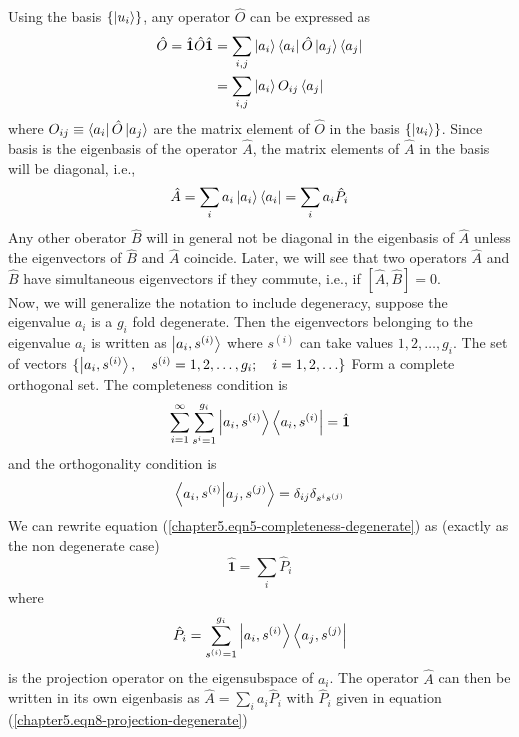 	Using the basis $\{\ket{u_i}\}$, any operator $\hat{O}$ can be expressed as 
	\begin{eqnarray}
		\hat{O} = \hat{\mathbf{1}} \hat{O} \hat{\mathbf{1}} 
		&= \sum_{i,j} \ket{a_i}\bra{a_i} \hat{O} \ket{a_j}\bra{a_j} \nonumber \\
		&= \sum_{i,j} \ket{a_i} O_{ij} \bra{a_j}
		\label{chapter5.eqn3-operator-as-matrix}
	\end{eqnarray}
	where $O_{ij} \equiv \bra{a_i} \hat{O} \ket{a_j}$ are the matrix element of  $\hat{O}$ in the basis $\{\ket{u_i}\}$. Since basis is the eigenbasis of the operator $\hat{A}$, the matrix elements of $\hat{A}$ in the basis will be diagonal, i.e., 
	\begin{equation}
		\hat{A} = \sum_i a_i \ket{a_i}\bra{a_i} = \sum_i a_i \hat{P}_i
		\label{chapter5.eqn4-diagonalized-operator-projection}
	\end{equation}
	Any other oberator $\hat{B}$ will in general not be diagonal in the eigenbasis of $\hat{A}$ unless the eigenvectors of $\hat{B}$ and $\hat{A}$ coincide. Later, we will see that two operators $\hat{A}$ and $\hat{B}$ have simultaneous eigenvectors if they commute, i.e., if $[\hat{A},\hat{B}]=0$.\\
	
	Now, we will generalize the notation to include degeneracy, suppose the eigenvalue $a_i$ is a $g_i$ fold degenerate. Then the eigenvectors belonging to the eigenvalue $a_i$ is written as $\ket{a_i, s^{(i)}}$ where $s^{(i)}$ can take values $1,2,\ldots, g_i$. The set of vectors $\{\ket{a_i, s^{(i)}}, \quad s^{(i)}=1,2,\ldots,g_i;\quad i=1,2,\ldots\}$ Form a complete orthogonal set. The completeness condition is
	\begin{equation}
		\sum_{i=1}^{\infty} \sum_{s^{i}=1}^{g_i} \ket{a_i, s^{(i)}}\bra{a_i, s^{(i)}} = \hat{\mathbf{1}}
		\label{chapter5.eqn5-completeness-degenerate}
	\end{equation}
	and the orthogonality condition is
	\begin{equation}
		\braket{a_i, s^{(i)}}{a_j, s^{(j)}} = \delta_{ij}\delta_{s^{i}s^{(j)}}
		\label{chapter5.eqn6-orthogonality-degenerate}
	\end{equation}
	We can rewrite equation (\ref{chapter5.eqn5-completeness-degenerate}) as (exactly as the non degenerate case)
	\begin{equation}
		\hat{\mathbf{1}} = \sum_i \hat{P}_i
		\label{chapter5.eqn7-completeness-degenerate-rewrite}
	\end{equation}
	where
	\begin{equation}
		\hat{P}_i = \sum_{s^{(i)}=1}^{g_i} \ket{a_i, s^{(i)}}\bra{a_j, s^{(j)}}
		\label{chapter5.eqn8-projection-degenerate}
	\end{equation}
	is the projection operator on the eigensubspace of $a_i$. The operator $\hat{A}$ can then be written in its own eigenbasis as 
	$\hat{A} = \sum_i a_i \hat{P}_i$ with $\hat{P}_i$ given in equation (\ref{chapter5.eqn8-projection-degenerate})
	
